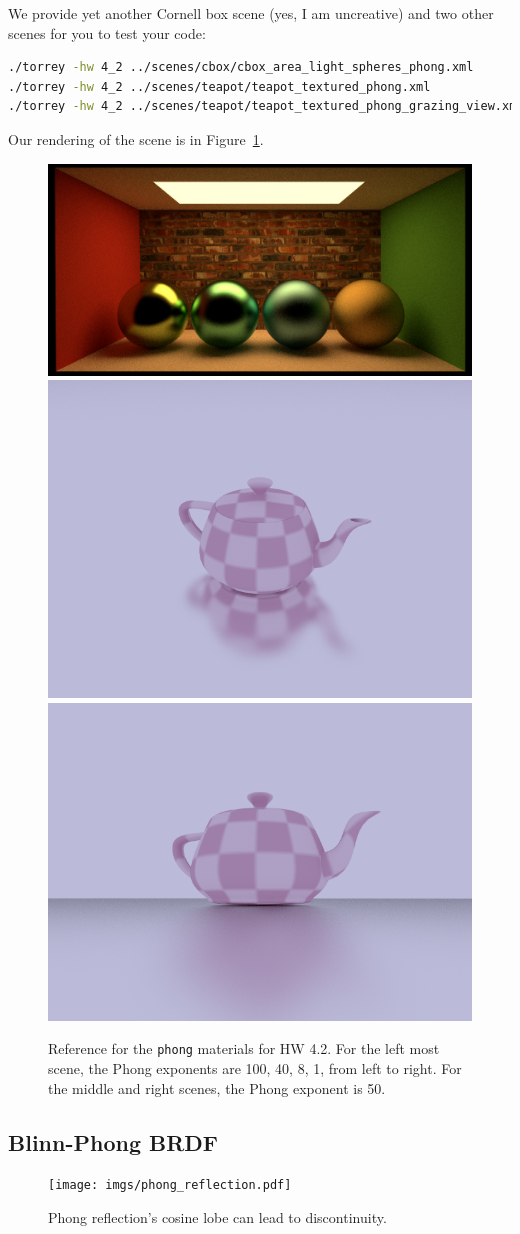 We provide yet another Cornell box scene (yes, I am uncreative) and two other scenes for you to test your code:
\begin{lstlisting}[language=bash]
./torrey -hw 4_2 ../scenes/cbox/cbox_area_light_spheres_phong.xml
./torrey -hw 4_2 ../scenes/teapot/teapot_textured_phong.xml
./torrey -hw 4_2 ../scenes/teapot/teapot_textured_phong_grazing_view.xml
\end{lstlisting}
Our rendering of the scene is in Figure~\ref{fig:hw_4_2_phong}.

\begin{figure}[ht]
    \centering
    \includegraphics[width=0.45\linewidth]{imgs/hw_4_2c.png}
    \includegraphics[width=0.225\linewidth]{imgs/hw_4_2d.png}
    \includegraphics[width=0.225\linewidth]{imgs/hw_4_2e.png}
    \caption{Reference for the \lstinline{phong} materials for HW 4.2. For the left most scene, the Phong exponents are 100, 40, 8, 1, from left to right. For the middle and right scenes, the Phong exponent is 50.}
    \label{fig:hw_4_2_phong}
\end{figure}

\subsection{Blinn-Phong BRDF}
\begin{figure}[ht]
    \centering
    \texttt{[image: imgs/phong\_reflection.pdf]}
    \caption{Phong reflection's cosine lobe can lead to discontinuity.}
    \label{fig:phong_reflection}
\end{figure}

